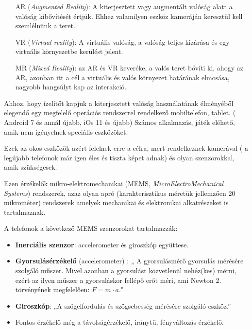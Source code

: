 
\begin{itemize}
\item[AR] (\textit{Augmented Reality}):
A kiterjesztett vagy augmentált valóság alatt a valóság kibővítését értjük. Ehhez valamilyen eszköz kameráján keresztül kell szemlélnünk a teret.
\item[VR] (\textit{Virtual reality}): A virtuális valóság, a valóság teljes kizárása és egy virtuális környezetbe kerülést jelent. 
\item[MR] (\textit{Mixed Reality}): az AR és VR keveréke, a valós teret bővíti ki, ahogy az AR, azonban itt a cél a virtuális és valós környezet határának elmosása, nagyobb hangsúlyt kap az interakció. 
\end{itemize}



Ahhoz, hogy ízelítőt kapjuk a kiterjesztett valóság használatának élményéből elegendő egy megfelelő operációs rendszerrel rendelkező mobiltelefon, tablet. ( Android 7 és annál újabb, iOs 11 és újabb)
Számos alkalmazás, játék eléhető, amik nem igényelnek speciális eszközöket. 

Ezek az okos eszközök azért felelnek erre a célra, mert rendelkeznek kamerával ( a legújabb telefonok már igen éles és tiszta képet adnak) és olyan szenzorokkal, amik  szükségesek.

Ezen érzékelők  mikro-elektromechanikai (MEMS, \textit{MicroElectroMechanical Systems}) 
rendszerek, azaz olyan apró (karakterisztikus méretük jellemzően 20 mikrométer) rendszerek amelyek mechanikai és elektronikai alkatrészeket is tartalmaznak.

A telefonok a következő MEMS szenzorokat tartalmazzák:
\begin{itemize}
\item {\bf Inerciális szenzor}: accelerometer és giroszkóp együttese.
\item {\bf Gyorsulásérzékelő} (accelerometer) : „ A gyorsulásmérő gyorsulás mérésére szolgáló műszer. Mivel azonban a gyorsulást közvetlenül nehéz(kes) mérni, ezért az ilyen műszer a gyorsuláskor fellépő erőt méri, ami Newton 2. törvényének megfelelően: $F = m\cdot a.$"

\item {\bf Giroszkóp}: „A szögelfordulás és szögsebesség mérésére szolgáló eszköz.”
\item Fontos érzékelő még a távolságérzékelő, iránytű, fényváltozás érzékelő.
\end{itemize}

